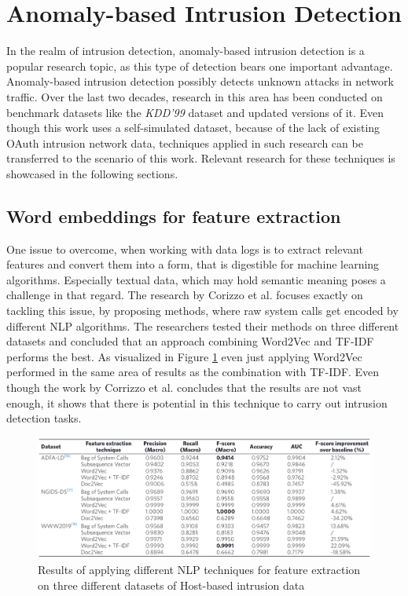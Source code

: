 \section{Anomaly-based Intrusion Detection}
\label{sec:anomaly_based_intrusion_detection}
In the realm of intrusion detection, anomaly-based intrusion detection is a popular research topic, as this type of detection bears one important advantage. Anomaly-based intrusion detection possibly detects unknown attacks in network traffic. Over the last two decades, research in this area has been conducted on benchmark datasets like the \emph{KDD’99} dataset \cite{kdd1999} and updated versions of it. Even though this work uses a self-simulated dataset, because of the lack of existing OAuth intrusion network data, techniques applied in such research can be transferred to the scenario of this work. Relevant research for these techniques is showcased in the following sections.

\subsection{Word embeddings for feature extraction}
One issue to overcome, when working with data logs is to extract relevant features and convert them into a form, that is digestible for machine learning algorithms. Especially textual data, which may hold semantic meaning poses a challenge in that regard. The research by Corizzo et al. \cite{corizzo2020feature} focuses exactly on tackling this issue, by proposing methods, where raw system calls get encoded by different NLP algorithms. The researchers tested their methods on three different datasets and concluded that an approach combining Word2Vec and TF-IDF performs the best. As visualized in Figure \ref{fig:w2v_feat_extr} even just applying Word2Vec performed in the same area of results as the combination with TF-IDF. Even though the work by Corrizzo et al. concludes that the results are not vast enough, it shows that there is potential in this technique to carry out intrusion detection tasks.

\begin{figure}[H]
	\sffamily\footnotesize
	\includegraphics[width=1\textwidth]{pic/w2v_feat_extr.png}
	\unitlength=0.75mm
	\linethickness{0.4pt}
	\caption{Results of applying different NLP techniques for feature extraction on three different datasets of Host-based intrusion data \cite{corizzo2020feature}}
	\label{fig:w2v_feat_extr}
\end{figure}


